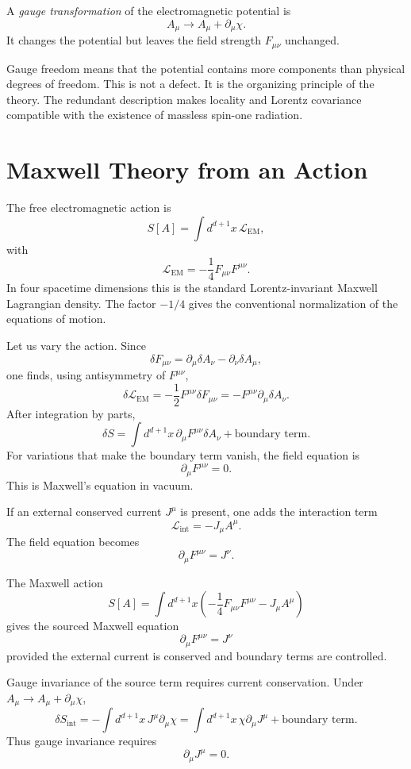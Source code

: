 \begin{definitionbox}
A \emph{gauge transformation} of the electromagnetic potential is
\[
    A_\mu\longrightarrow A_\mu+\partial_\mu\chi.
\]
It changes the potential but leaves the field strength \(F_{\mu\nu}\) unchanged.
\end{definitionbox}

Gauge freedom means that the potential contains more components than physical
degrees of freedom. This is not a defect. It is the organizing principle of the
theory. The redundant description makes locality and Lorentz covariance
compatible with the existence of massless spin-one radiation.

\section{Maxwell Theory from an Action}

The free electromagnetic action is
\[
    S[A]=\int d^{d+1}x\,\mathcal{L}_{\mathrm{EM}},
\]
with
\[
    \mathcal{L}_{\mathrm{EM}}
    =-\frac{1}{4}F_{\mu\nu}F^{\mu\nu}.
\]
In four spacetime dimensions this is the standard Lorentz-invariant Maxwell
Lagrangian density. The factor \(-1/4\) gives the conventional normalization of
the equations of motion.

Let us vary the action. Since
\[
    \delta F_{\mu\nu}=\partial_\mu\delta A_\nu-\partial_\nu\delta A_\mu,
\]
one finds, using antisymmetry of \(F^{\mu\nu}\),
\[
    \delta\mathcal{L}_{\mathrm{EM}}
    =-\frac{1}{2}F^{\mu\nu}\delta F_{\mu\nu}
    =-F^{\mu\nu}\partial_\mu\delta A_\nu.
\]
After integration by parts,
\[
    \delta S
    =\int d^{d+1}x\,\partial_\mu F^{\mu\nu}\delta A_\nu
    +\text{boundary term}.
\]
For variations that make the boundary term vanish, the field equation is
\[
    \partial_\mu F^{\mu\nu}=0.
\]
This is Maxwell's equation in vacuum.

If an external conserved current \(J^\mu\) is present, one adds the interaction
term
\[
    \mathcal{L}_{\mathrm{int}}=-J_\mu A^\mu.
\]
The field equation becomes
\[
    \partial_\mu F^{\mu\nu}=J^\nu.
\]

\begin{theorembox}
The Maxwell action
\[
    S[A]=\int d^{d+1}x\left(-\frac{1}{4}F_{\mu\nu}F^{\mu\nu}-J_\mu A^\mu\right)
\]
gives the sourced Maxwell equation
\[
    \partial_\mu F^{\mu\nu}=J^\nu
\]
provided the external current is conserved and boundary terms are controlled.
\end{theorembox}

Gauge invariance of the source term requires current conservation. Under
\(A_\mu\to A_\mu+\partial_\mu\chi\),
\[
    \delta S_{\mathrm{int}}
    =-\int d^{d+1}x\,J^\mu\partial_\mu\chi
    =\int d^{d+1}x\,\chi\partial_\mu J^\mu
    +\text{boundary term}.
\]
Thus gauge invariance requires
\[
    \partial_\mu J^\mu=0.
\]

